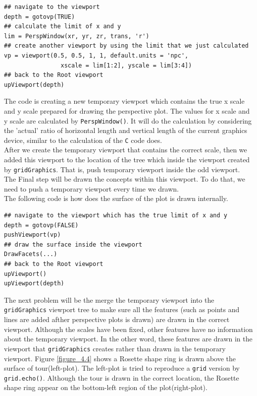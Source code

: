 \documentclass[paper=a4, fontsize=11pt]{report}
\begin{document}
\begin{lstlisting}
## navigate to the viewport
depth = gotovp(TRUE) 
## calculate the limit of x and y
lim = PerspWindow(xr, yr, zr, trans, 'r')  
## create another viewport by using the limit that we just calculated
vp = viewport(0.5, 0.5, 1, 1, default.units = 'npc',
                xscale = lim[1:2], yscale = lim[3:4]) 
## back to the Root viewport
upViewport(depth)  
\end{lstlisting}
The code is creating a new temporary viewport which contains the true x scale and y scale prepared for drawing the perspective plot. The values for x scale and y scale are calculated by \texttt{PerspWindow()}. It will do the calculation by considering the 'actual' ratio of horizontal length and vertical length of the current graphics device, similar to the calculation of the \texttt{C} code does.\\
After we create the temporary viewport that contains the correct scale, then we added this viewport to the location of the tree which inside the viewport created by \texttt{gridGraphics}. That is, push temporary viewport inside the odd viewport. The Final step will be drawn the concepts within this viewport. To do that, we need to push a temporary viewport every time we drawn.\\ 
The following code is how does the surface of the plot is drawn internally.
\begin{lstlisting}
## navigate to the viewport which has the true limit of x and y
depth = gotovp(FALSE)
pushViewport(vp)
## draw the surface inside the viewport
DrawFacets(...)
## back to the Root viewport
upViewport()
upViewport(depth)
\end{lstlisting}

The next problem will be the merge the temporary viewport into the \texttt{gridGraphics} viewport tree to make sure all the features (such as points and lines are added afther perspective plots is drawn) are drawn in the correct viewport. Although the scales have been fixed, other features have no information about the temporary viewport. In the other word, these features are drawn in the viewport that \texttt{gridGraphics} creates rather than drawn in the temporary viewport. Figure \ref{figure_4.4} shows a Rosette shape ring is drawn above the surface of tour(left-plot). The left-plot is tried to reproduce a \texttt{grid} version by \texttt{grid.echo()}. Although the tour is drawn in the correct location, the Rosette shape ring appear on the bottom-left region of the plot(right-plot).
\end{document}
